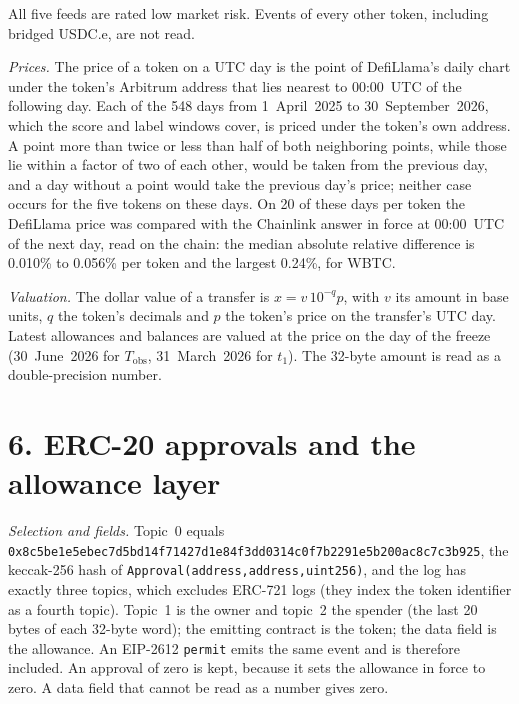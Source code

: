 \documentclass[10pt,letterpaper]{article}
\newcommand{\hash}[1]{\texttt{\small #1}}
\begin{document}
All five feeds are rated low market risk. Events of every other token, including bridged USDC.e, are not read.

\textit{Prices.} The price of a token on a UTC day is the point of DefiLlama's daily chart under the token's Arbitrum address that lies nearest to 00:00~UTC of the following day. Each of the 548 days from 1~April~2025 to 30~September~2026, which the score and label windows cover, is priced under the token's own address. A point more than twice or less than half of both neighboring points, while those lie within a factor of two of each other, would be taken from the previous day, and a day without a point would take the previous day's price; neither case occurs for the five tokens on these days. On 20 of these days per token the DefiLlama price was compared with the Chainlink answer in force at 00:00~UTC of the next day, read on the chain: the median absolute relative difference is 0.010\% to 0.056\% per token and the largest 0.24\%, for WBTC.

\textit{Valuation.} The dollar value of a transfer is $x=v\,10^{-q}p$, with $v$ its amount in base units, $q$ the token's decimals and $p$ the token's price on the transfer's UTC day. Latest allowances and balances are valued at the price on the day of the freeze (30~June~2026 for $T_{\mathrm{obs}}$, 31~March~2026 for $t_1$). The 32-byte amount is read as a double-precision number.

\section*{6. ERC-20 approvals and the allowance layer}
\textit{Selection and fields.} Topic~0 equals \hash{0x8c5be1e5ebec7d5bd14f71427d1e84f3dd0314c0f7b2291e5b200ac8c7c3b925}, the keccak-256 hash of \texttt{Approval(address,address,uint256)}, and the log has exactly three topics, which excludes ERC-721 logs (they index the token identifier as a fourth topic). Topic~1 is the owner and topic~2 the spender (the last 20 bytes of each 32-byte word); the emitting contract is the token; the data field is the allowance. An EIP-2612 \texttt{permit} emits the same event and is therefore included. An approval of zero is kept, because it sets the allowance in force to zero. A data field that cannot be read as a number gives zero.
\end{document}
